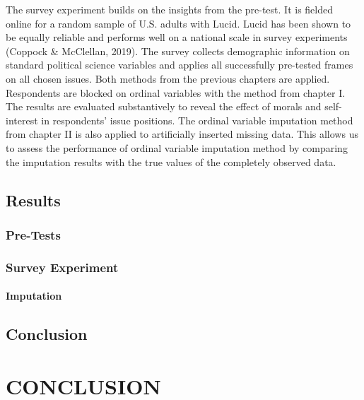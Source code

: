 \documentclass[12pt,econ]{sources/authesis}
\begin{document}
The survey experiment builds on the insights from the pre-test. It is fielded online for a random sample of U.S. adults with Lucid. Lucid has been shown to be equally reliable and performs well on a national scale in survey experiments (Coppock \& McClellan, 2019). The survey collects demographic information on standard political science variables and applies all successfully pre-tested frames on all chosen issues. Both methods from the previous chapters are applied. Respondents are blocked on ordinal variables with the method from chapter I. The results are evaluated substantively to reveal the effect of morals and self-interest in respondents' issue positions. The ordinal variable imputation method from chapter II is also applied to artificially inserted missing data. This allows us to assess the performance of ordinal variable imputation method by comparing the imputation results with the true values of the completely observed data.

\hypertarget{framing-results}{%
\section{Results}\label{framing-results}}

\hypertarget{framing-results-pre-tests}{%
\subsection{Pre-Tests}\label{framing-results-pre-tests}}

\hypertarget{framing-results-experiment}{%
\subsection{Survey Experiment}\label{framing-results-experiment}}

\hypertarget{framing-results-experiment-imputation}{%
\subsubsection{Imputation}\label{framing-results-experiment-imputation}}

\hypertarget{framing-conclusion}{%
\section{Conclusion}\label{framing-conclusion}}

\hypertarget{conclusion}{%
\chapter{CONCLUSION}\label{conclusion}}
\end{document}

